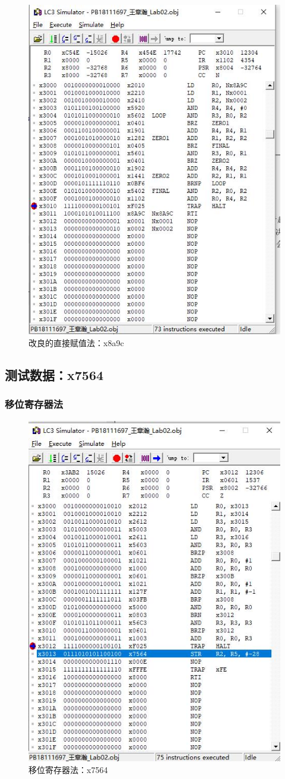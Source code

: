 \documentclass[UTF8]{article}
\begin{document}
\begin{figure}[H]
\begin{minipage}[H]{0.48\linewidth}
			\includegraphics[scale=0.4]{x8a9c_3.jpg}
			\caption{改良的直接赋值法：x8a9c}
			\label{x8a9c_3}
		\end{minipage}
	\end{figure}

	\subsection{测试数据：x7564}
	\subsubsection{移位寄存器法}
	\begin{figure}[H]
		\centering
		\includegraphics[width=0.4\linewidth]{x7564_1.jpg}
		\caption{移位寄存器法：x7564}
		\label{x7564_1}
	\end{figure}\par
\end{document}
